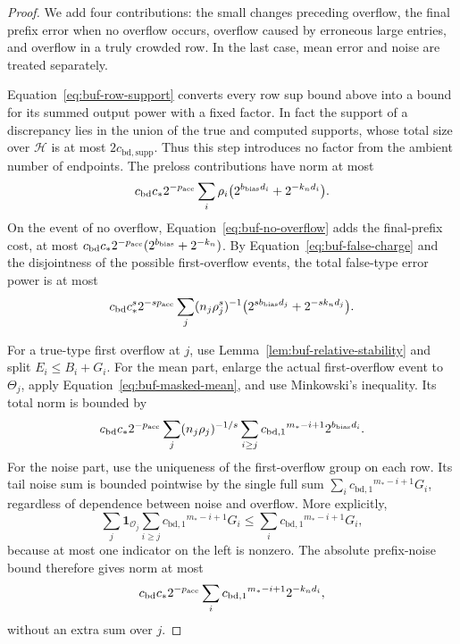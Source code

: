 \documentclass[11pt]{article}
\numberwithin{equation}{section}
\theoremstyle{definition}
\theoremstyle{remark}
\begin{document}
\begin{proof}
We add four contributions: the small changes preceding overflow, the final prefix error when no overflow occurs, overflow caused by erroneous large entries, and overflow in a truly crowded row. In the last case, mean error and noise are treated separately.

Equation~\eqref{eq:buf-row-support} converts every row sup bound above
into a bound for its summed output power with a fixed factor.
In fact the support of a discrepancy lies in the union of the true and
computed supports, whose total size over $\mathcal H$ is at most
$2{c_{\mathrm{bd},\mathrm{supp}}}$.  Thus this step introduces no factor from the
ambient number of endpoints.
The preloss contributions have norm at most
\[
 {c_{\rm bd}}c_*2^{-{p_{\rm acc}}}\sum_i\rho_i
             \bigl(2^{{b_{\rm bias}}d_i}+2^{-{k}_nd_i}\bigr).
\]
On the event of no overflow, Equation~\eqref{eq:buf-no-overflow} adds the
final-prefix cost, at most ${c_{\rm bd}}c_*2^{-{p_{\rm acc}}}(2^{{b_{\rm bias}}}+2^{-{k}_n})$.
By Equation~\eqref{eq:buf-false-charge} and the disjointness of the
possible first-overflow events, the total false-type error power is at
most
\begin{equation}
 {c_{\rm bd}}c_*^s2^{-s{p_{\rm acc}}}\sum_j
       (n_j\rho_j^s)^{-1}
       \bigl(2^{s{b_{\rm bias}}d_j}+2^{-s{k}_nd_j}\bigr).
 \label{eq:buf-false-sum}
\end{equation}

For a true-type first overflow at $j$, use
Lemma~\ref{lem:buf-relative-stability} and split ${E_i}\leq{B_i}+{G_i}$.
For the mean part, enlarge the actual first-overflow event to $\Theta_j$,
apply Equation~\eqref{eq:buf-masked-mean}, and use Minkowski's inequality.
Its total norm is bounded by
\begin{equation}
 {c_{\rm bd}}c_*2^{-{p_{\rm acc}}}\sum_j(n_j\rho_j)^{-1/s}
       \sum_{i\geq j}{c_{\mathrm{bd},1}}^{m_*-i+1}2^{{b_{\rm bias}}d_i}.
 \label{eq:buf-true-sum}
\end{equation}
For the noise part, use the uniqueness of the first-overflow group on
each row.  Its tail noise sum is bounded pointwise by the single full
sum $\sum_i{c_{\mathrm{bd},1}}^{m_*-i+1}{G_i}$, regardless of dependence between
noise and overflow.  More explicitly,
\[
 \sum_j\mathbf1_{\mathcal O_j}
       \sum_{i\geq j}{c_{\mathrm{bd},1}}^{m_*-i+1}{G_i}
 \leq\sum_i {c_{\mathrm{bd},1}}^{m_*-i+1}{G_i},
\]
because at most one indicator on the left is nonzero.  The absolute
prefix-noise bound therefore gives
norm at most
\begin{equation}
 {c_{\rm bd}}c_*2^{-{p_{\rm acc}}}\sum_i{c_{\mathrm{bd},1}}^{m_*-i+1}2^{-{k}_nd_i},
 \label{eq:buf-noise-sum}
\end{equation}
without an extra sum over $j$.


\end{proof}
\end{document}
